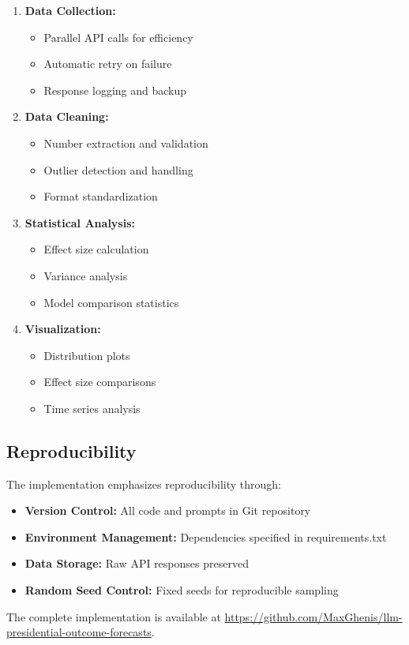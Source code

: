 \begin{enumerate}
    \item \textbf{Data Collection:}
    \begin{itemize}
        \item Parallel API calls for efficiency
        \item Automatic retry on failure
        \item Response logging and backup
    \end{itemize}
    
    \item \textbf{Data Cleaning:}
    \begin{itemize}
        \item Number extraction and validation
        \item Outlier detection and handling
        \item Format standardization
    \end{itemize}
    
    \item \textbf{Statistical Analysis:}
    \begin{itemize}
        \item Effect size calculation
        \item Variance analysis
        \item Model comparison statistics
    \end{itemize}
    
    \item \textbf{Visualization:}
    \begin{itemize}
        \item Distribution plots
        \item Effect size comparisons
        \item Time series analysis
    \end{itemize}
\end{enumerate}

\subsection{Reproducibility}

The implementation emphasizes reproducibility through:

\begin{itemize}
    \item \textbf{Version Control:} All code and prompts in Git repository
    \item \textbf{Environment Management:} Dependencies specified in requirements.txt
    \item \textbf{Data Storage:} Raw API responses preserved
    \item \textbf{Random Seed Control:} Fixed seeds for reproducible sampling
\end{itemize}

The complete implementation is available at \url{https://github.com/MaxGhenis/llm-presidential-outcome-forecasts}.